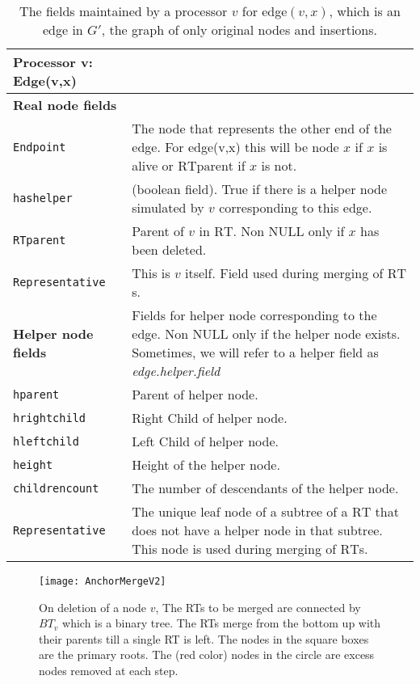 \documentclass[11pt, letter]{article}
\newcommand{\RT}{\mathrm{RT}}
\newcommand{\RTparent}{\mathrm{RTparent}}
\begin{document}
\begin{table}[h!]
\begin{tabular}{|l|p{4.5in}|}
\hline 
\textbf{Processor v: Edge(v,x)}&\\ \cline{2-2}
\hline 
\textbf{Real node fields}&\\ \cline{2-2}
\hline
\texttt{Endpoint}& The node that represents the other end of the edge. For edge(v,x) this will be node $x$ if $x$ is
alive or $\RTparent$ if $x$ is not. \\
\texttt{hashelper}& (boolean field). True if there is a helper node simulated by $v$ corresponding to this edge.\\
  \texttt{RTparent} & Parent of $v$ in $\RT$. Non NULL only if $x$ has been deleted.\\
   \texttt{Representative}& This is $v$ itself. Field used during merging of $\RT$s. \\
\hline
\textbf{Helper node fields} & Fields for helper node corresponding to the edge. Non NULL only if the helper node exists.
Sometimes, we will refer to a helper field as \emph{edge.helper.field}\\
\cline{2-2}
\hline
 \texttt{hparent}& Parent of helper node. \\
 \texttt{hrightchild}& Right Child of helper node. \\
 \texttt{hleftchild}& Left Child of helper node. \\
 \texttt{height} &  Height of the helper node.\\
 \texttt{childrencount} & The number of descendants of the helper node.\\
 \texttt{Representative}& The unique leaf node of a subtree of a $\RT$ that does not have a helper node in that
subtree. This node is used during merging of $\RT$s.\\
\hline
\end{tabular}
\caption{The fields maintained by a processor $v$ for edge$(v,x)$, which is an edge in $G'$, the graph of only original nodes and  insertions.}
\label{tab: nodedata}
\end{table}


\begin{figure}[h!]
\centering
\texttt{[image: AnchorMergeV2]}
\caption{On deletion of a node $v$, The RTs to be merged are connected by  $BT_{v}$ which is a binary tree. The RTs merge
from the bottom up with their parents till a single RT is left. The nodes in the square boxes are the primary roots. The (red
color) nodes in the circle are excess nodes removed at each step.}
\label{fig: Anchormerge}
\end{figure}
\end{document}
